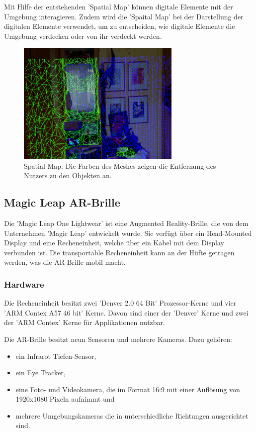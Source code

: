 Mit Hilfe der entstehenden 'Spatial Map' können digitale Elemente mit der Umgebung interagieren. Zudem wird die 'Spaital Map' bei der Darstellung der digitalen Elemente verwendet, um zu entscheiden, wie digitale Elemente die Umgebung verdecken oder von ihr verdeckt werden.\citep{spatialMapping} 

\begin{figure}[H]
	\centering
	\includegraphics[width=0.7\textwidth]{images/ML_20201003_15.36.42.jpg}
	\caption[Spatial Mapping]{Spatial Map. Die Farben des Meshes zeigen die Entfernung des Nutzers zu den Objekten an.}
	\label{img:spatialmap}
\end{figure}

\subsection{Magic Leap AR-Brille}

Die 'Magic Leap One Lightwear' ist eine Augmented Reality-Brille, die von dem Unternehmen 'Magic Leap' entwickelt wurde. Sie verfügt über ein Head-Mounted Display und eine Recheneinheit, welche über ein Kabel mit dem Display verbunden ist. Die transportable Recheneinheit kann an der Hüfte getragen werden, was die AR-Brille mobil macht. 


\subsubsection{Hardware}

Die Recheneinheit besitzt zwei 'Denver 2.0 64 Bit' Prozessor-Kerne und vier 'ARM Contex A57 46 bit' Kerne. Davon sind einer der 'Denver' Kerne und zwei der 'ARM Contex' Kerne für Applikationen nutzbar.  

Die AR-Brille besitzt neun Sensoren und mehrere Kameras. Dazu gehören:
\begin{itemize}
	\item ein Infrarot Tiefen-Sensor,
	\item ein Eye Tracker,
	\item eine Foto- und Videokamera, die im Format 16:9 mit einer Auflösung von 1920x1080 Pixeln aufnimmt und
	\item mehrere Umgebungskameras die in unterschiedliche Richtungen ausgerichtet sind. \citep{mlofficialsalespitch,mlglossary}
\end{itemize}

